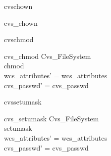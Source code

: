 \begin{zedgroup}
\begin{doc}{cvschown}
\begin{schema}{cvs\_chown}
    \end{schema}
  \end{doc}
  \begin{doc}{cvschmod}
    \begin{schema}{cvs\_chmod}
      \Delta Cvs\_FileSystem\\
      chmod \\
      \where
      wcs\_attributes' = wcs\_attributes \\
      cvs\_passwd' = cvs\_passwd \\ 
    \end{schema}
  \end{doc}
  \begin{doc}{cvssetumask}
    \begin{schema}{cvs\_setumask}
      \Delta Cvs\_FileSystem\\
      setumask \\
      \where
      wcs\_attributes' = wcs\_attributes \\
      cvs\_passwd' = cvs\_passwd \\ 
    \end{schema}
  \end{doc}
\end{zedgroup}



